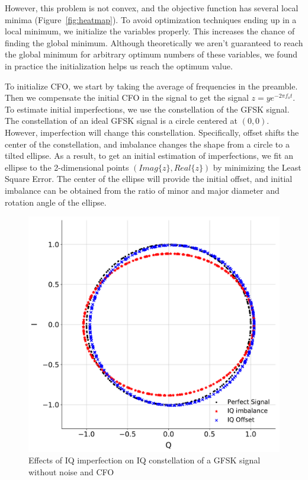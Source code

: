 However, this problem is not convex, and the objective function has several local minima (Figure~\ref{fig:heatmap}). To avoid optimization techniques ending up in a local minimum, we initialize the variables properly. This increases the chance of finding the global minimum. Although theoretically we aren't guaranteed to reach the global minimum for arbitrary optimum numbers of these variables, we found in practice the initialization helps us reach the optimum value.

To initialize CFO, we start by taking the average of frequencies in the preamble. Then we compensate the initial CFO in the signal to get the signal $z = y e^{-2\pi f_o t}$. To estimate initial \iq imperfections, we use the \iq constellation of the GFSK signal. The \iq constellation of an ideal GFSK signal is a circle centered at $(0,0)$. However, \iq imperfection will change this constellation. Specifically, \iq offset shifts the center of the constellation, and \iq imbalance changes the shape from a circle to a tilted ellipse.
%
As a result, to get an initial estimation of \iq imperfections, we fit an ellipse to the 2-dimensional points $(Imag\{z\},Real\{z\})$ by minimizing the Least Square Error. The center of the ellipse will provide the initial \iq offset, and initial \iq imbalance can be obtained from the ratio of minor and major diameter and rotation angle of the ellipse.

\begin{figure}
    \centering
    \includegraphics[width = \linewidth]{bletracking/plots/IQ_const.pdf} 
    \caption{Effects of IQ imperfection on IQ constellation of a GFSK signal without noise and CFO}
    \label{fig:iq_const}
\end{figure}
\fi

